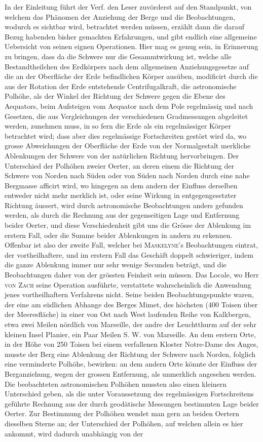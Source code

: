In der Einleitung führt der Verf. den Leser zuvörderst auf den Standpunkt, von welchem das Phänomen der Anziehung der Berge und die Beobachtungen, wodurch es sichtbar wird, betrachtet werden müssen, erzählt dann die darauf Bezug habenden bisher gemachten Erfahrungen, und gibt endlich eine allgemeine Uebersicht von seinen eignen Operationen. Hier mag es genug sein, in Erinnerung zu bringen, dass da die Schwere nur die Gesammtwirkung ist, welche alle Bestandtheilchen des Erdkörpers nach dem allgemeinen Anziehungsgesetze auf die an der Oberfläche der Erde befindlichen Körper ausüben, modificirt durch die aus der Rotation der Erde entstehende Centrifugalkraft, die astronomische Polhöhe, als der Winkel der Richtung der Schwere gegen die Ebene des Aequators, beim Aufsteigen vom Aequator nach dem Pole regelmässig und nach Gesetzen, die aus Vergleichungen der verschiedenen Gradmessungen abgeleitet werden, zunehmen muss, in so fern die Erde als ein regelmässiger Körper betrachtet wird; dass aber dies regelmässige Fortschreiten gestört wird da, wo grosse Abweichungen der Oberfläche der Erde von der Normalgestalt merkliche Ablenkungen der Schwere von der natürlichen Richtung hervorbringen. Der Unterschied der Polhöhen zweier Oerter, an deren einem die Richtung der Schwere von Norden nach Süden oder von Süden nach Norden durch eine nahe Bergmasse afficirt wird, wo hingegen an dem andern der Einfluss derselben entweder nicht mehr merklich ist, oder seine Wirkung in entgegengesetzter Richtung äussert, wird durch astronomische Beobachtungen anders gefunden werden, als durch die Rechnung aus der gegenseitigen Lage und Entfernung beider Oerter, und diese Verschiedenheit gibt uns die Grösse der Ablenkung im erstern Fall, oder die Summe beider Ablenkungen in andern zu erkennen. Offenbar ist also der zweite Fall, welcher bei \textsc{Maskelyne}'s Beobachtungen eintrat, der vortheilhaftere, und im erstern Fall das Geschäft doppelt schwieriger, indem die ganze Ablenkung immer nur sehr wenige Secunden beträgt, und die Beobachtungen daher von der grössten Feinheit sein müssen. Das Locale, wo Herr \textsc{von Zach} seine Operation ausführte, verstattete wahrscheinlich die Anwendung jenes vortheilhaftern Verfahrens nicht. Seine beiden Beobachtungspunkte waren, der eine am südlichen Abhange des Berges Mimet, des höchsten (400 Toisen über der Meeresfläche) in einer von Ost nach West laufenden Reihe von Kalkbergen, etwa zwei Meilen nördlich von Marseille, der andre der Leuchtthurm auf der sehr kleinen Insel Planier, ein Paar Meilen S. W. von Marseille. An dem erstern Orte, in der Höhe von 250 Toisen bei einem verfallenen Kloster Notre-Dame des Anges, musste der Berg eine Ablenkung der Richtung der Schwere nach Norden, folglich eine verminderte Polhöhe, bewirken: an dem andern Orte könnte der Einfluss der Berganziehung, wegen der grossen Entfernung, als unmerklich angesehen werden. Die beobachteten astronomischen Polhöhen mussten also einen kleinern Unterschied geben, als die unter Voraussetzung des regelmässigen Fortschreitens geführte Rechnung aus der durch geodätische Messungen bestimmten Lage beider Oerter. Zur Bestimmung der Polhöhen wendet man gern an beiden Oertern dieselben Sterne an; der Unterschied der Polhöhen, auf welchen allein es hier ankommt, wird dadurch unabhängig von der 